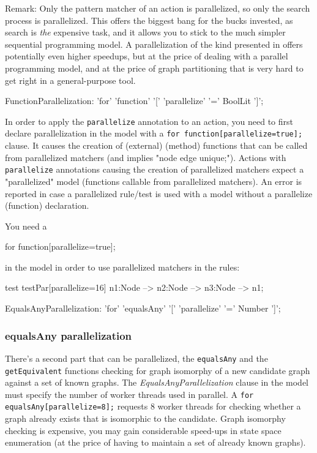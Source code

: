 Remark: Only the pattern matcher of an action is parallelized, so only the search process is parallelized.
This offers the biggest bang for the bucks invested, as search is \emph{the} expensive task, and it allows you to stick to the much simpler sequential programming model.
A parallelization of the kind presented in \cite{ParGraErs} offers potentially even higher speedups, but at the price of dealing with a parallel programming model, and at the price of graph partitioning that is very hard to get right in a general-purpose tool.

\begin{rail}
  FunctionParallelization: 'for' 'function' '[' 'parallelize' '=' BoolLit ']';
\end{rail}

In order to apply the \texttt{parallelize} annotation to an action, you need to first declare parallelization in the model with a \verb#for function[parallelize=true];# clause.
It causes the creation of (external) (method) functions that can be called from parallelized matchers (and implies "node edge unique;").
Actions with \texttt{parallelize} annotations causing the creation of parallelized matchers expect a "parallelized" model (functions callable from parallelized matchers).
An error is reported in case a parallelized rule/test is used with a model without a parallelize (function) declaration.

\begin{example}
You need a
\begin{grgen}
for function[parallelize=true];
\end{grgen}
in the model in order to use parallelized matchers in the rules:
\begin{grgen}
test testPar[parallelize=16]
{
	n1:Node --> n2:Node --> n3:Node --> n1;
}
\end{grgen}
\end{example}

\begin{rail}
  EqualsAnyParallelization: 'for' 'equalsAny' '[' 'parallelize' '=' Number ']';
\end{rail}


\subsubsection*{equalsAny parallelization}

There's a second part that can be parallelized, the \texttt{equalsAny} and the \texttt{getEquivalent} functions checking for graph isomorphy of a new candidate graph against a set of known graphs.
The \emph{EqualsAnyParallelization} clause in the model must specify the number of worker threads used in parallel.
A \verb#for equalsAny[parallelize=8];# requests 8 worker threads for checking whether a graph already exists that is isomorphic to the candidate.
Graph isomorphy checking is expensive, you may gain considerable speed-ups in state space enumeration (at the price of having to maintain a set of already known graphs).

